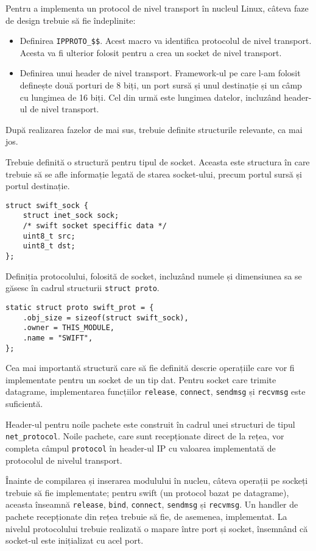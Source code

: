 Pentru a implementa un protocol de nivel transport în nucleul Linux, câteva
faze de design trebuie să fie îndeplinite:

\begin{itemize}
  \item Definirea \texttt{IPPROTO\_\$\$}. Acest macro va identifica protocolul
  de nivel transport. Acesta va fi ulterior folosit pentru a crea un socket de
  nivel transport.
  \item Definirea unui header de nivel transport. Framework-ul pe care l-am
  folosit definește două porturi de 8 biți, un port sursă și unul destinație
  și un câmp cu lungimea de 16 biți. Cel din urmă este lungimea datelor,
  incluzând header-ul de nivel transport.
\end{itemize}

După realizarea fazelor de mai sus, trebuie definite structurile relevante, ca
mai jos.

Trebuie definită o structură pentru tipul de socket. Aceasta este structura în
care trebuie să se afle informație legată de starea socket-ului, precum portul
sursă și portul destinație.

\begin{verbatim}
struct swift_sock {
    struct inet_sock sock;
    /* swift socket speciffic data */
    uint8_t src;
    uint8_t dst;
};
\end{verbatim}

Definiția protocolului, folosită de socket, incluzând numele și dimensiunea sa
se găsesc în cadrul structurii \texttt{struct proto}.

\begin{verbatim}
static struct proto swift_prot = {
    .obj_size = sizeof(struct swift_sock),
    .owner = THIS_MODULE,
    .name = "SWIFT",
};
\end{verbatim}

Cea mai importantă structură care să fie definită descrie operațiile care vor
fi implementate pentru un socket de un tip dat. Pentru socket care trimite
datagrame, implementarea funcțiilor \texttt{release}, \texttt{connect},
\texttt{sendmsg} și \texttt{recvmsg} este suficientă.

Header-ul pentru noile pachete este construit în cadrul unei structuri de
tipul \texttt{net\_protocol}. Noile pachete, care sunt recepționate direct de
la rețea, vor completa câmpul \texttt{protocol} în header-ul IP cu valoarea
implementată de protocolul de nivelul transport.

Înainte de compilarea și inserarea modulului în nucleu, câteva operații pe
sockeți trebuie să fie implementate; pentru swift (un protocol bazat pe
datagrame), aceasta înseamnă \texttt{release}, \texttt{bind}, \texttt{connect},
\texttt{sendmsg} și \texttt{recvmsg}. Un handler de pachete recepționate din
rețea trebuie să fie, de asemenea, implementat. La nivelul protocolului
trebuie realizată o mapare între port și socket, însemnând că socket-ul este
inițializat cu acel port.

